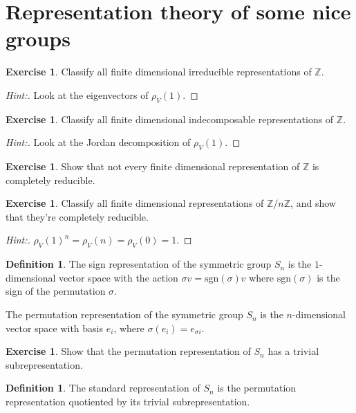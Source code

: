 \documentclass[11pt]{article}
\theoremstyle{plain}
\theoremstyle{definition}
\newtheorem{definition}[proposition]{Definition}
\newtheorem{exercise}[proposition]{Exercise}
\theoremstyle{remark}
\begin{document}
\section{Representation theory of some nice groups}

\begin{exercise}
Classify all finite dimensional irreducible representations of $\mathbb{Z}$.
\end{exercise}
\begin{proof}[Hint:]
Look at the eigenvectors of $\rho_V(1)$.
\end{proof}

\begin{exercise}
Classify all finite dimensional indecomposable representations of $\mathbb{Z}$.
\end{exercise}
\begin{proof}[Hint:]
Look at the Jordan decomposition of $\rho_V(1)$.
\end{proof}

\begin{exercise}
Show that not every finite dimensional representation of $\mathbb{Z}$ is completely reducible.
\end{exercise}

\begin{exercise}
Classify all finite dimensional representations of $\mathbb{Z}/n \mathbb{Z}$, and show that they're completely reducible.
\end{exercise}
\begin{proof}[Hint:]
$\rho_V(1)^n = \rho_V(n) = \rho_V(0) = 1$.
\end{proof}

\begin{definition}
The sign representation of the symmetric group $S_n$ is the $1$-dimensional vector space with the action $\sigma v = \mathrm{sgn}(\sigma) v$ where $\mathrm{sgn}(\sigma)$ is the sign of the permutation $\sigma$.

The permutation representation of the symmetric group $S_n$ is the $n$-dimensional vector space with basis $e_i$, where $\sigma(e_i) = e_{\sigma i}$.
\end{definition}

\begin{exercise}
Show that the permutation representation of $S_n$ has a trivial subrepresentation.
\end{exercise}

\begin{definition}
The standard representation of $S_n$ is the permutation representation quotiented by its trivial subrepresentation.
\end{definition}
\end{document}
